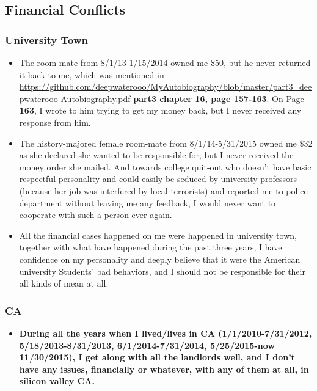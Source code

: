 \documentclass[9pt,b5paper]{article}
\begin{document}
\subsection{Financial Conflicts}
\label{sec-3-2}
\subsubsection{University Town}
\label{sec-3-2-1}
\begin{itemize}
\item The room-mate from 8/1/13-1/15/2014 owned me \$50, but he never returned it back to me, which was mentioned in \url{https://github.com/deepwaterooo/MyAutobiography/blob/master/part3_deepwaterooo-Autobiography.pdf} \textbf{part3 chapter 16, page 157-163}. On Page \textbf{163}, I wrote to him trying to get my money back, but I never received any response from him.
\item The history-majored female room-mate from 8/1/14-5/31/2015 owned me \$32 as she declared she wanted to be responsible for, but I never received the money order she mailed. And towards college quit-out who doesn't have basic respectful personality and could easily be seduced by university professors (because her job was interfered by local terrorists) and reported me to police department without leaving me any feedback, I would never want to cooperate with such a person ever again.
\item All the financial cases happened on me were happened in university town, together with what have happened during the past three years, I have confidence on my personality and deeply believe that it were the American university Students' bad behaviors, and I should not be responsible for their all kinds of mean at all.
\end{itemize}
\subsubsection{CA}
\label{sec-3-2-2}
\begin{itemize}
\item \textbf{During all the years when I lived/lives in CA (1/1/2010-7/31/2012, 5/18/2013-8/31/2013, 6/1/2014-7/31/2014, 5/25/2015-now 11/30/2015), I get along with all the landlords well, and I don't have any issues, financially or whatever, with any of them at all, in silicon valley CA.}
\end{itemize}
\end{document}
